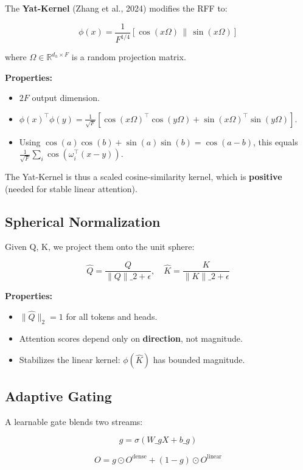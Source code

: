 The \textbf{Yat-Kernel} (Zhang et al., 2024) modifies the RFF to:

\[
\phi(x) = \frac{1}{F^{1/4}} [\cos(x \Omega) \,\|\, \sin(x \Omega)]
\]

where $\Omega \in \mathbb{R}^{d_h \times F}$ is a random projection matrix.

\textbf{Properties:}

\begin{itemize}
\item $2F$ output dimension.
\item $\phi(x)^\top \phi(y) = \frac{1}{\sqrt{F}} [\cos(x\Omega)^\top \cos(y\Omega) + \sin(x\Omega)^\top \sin(y\Omega)]$.
\item Using $\cos(a)\cos(b) + \sin(a)\sin(b) = \cos(a - b)$, this equals
  $\frac{1}{\sqrt{F}} \sum_i \cos(\omega_i^\top (x - y))$.

\end{itemize}
The Yat-Kernel is thus a scaled cosine-similarity kernel, which is 
\textbf{positive} (needed for stable linear attention).

\subsection{Spherical Normalization}

Given Q, K, we project them onto the unit sphere:

\[
\hat{Q} = \frac{Q}{\|Q\|\_2 + \epsilon}, \quad
\hat{K} = \frac{K}{\|K\|\_2 + \epsilon}
\]

\textbf{Properties:}

\begin{itemize}
\item $\|\hat{Q}\|_2 = 1$ for all tokens and heads.
\item Attention scores depend only on \textbf{direction}, not magnitude.
\item Stabilizes the linear kernel: $\phi(\hat{K})$ has bounded magnitude.

\end{itemize}
\subsection{Adaptive Gating}

A learnable gate blends two streams:

\[
g = \sigma(W\_g X + b\_g)
\]

\[
O = g \odot O^\text{dense} + (1 - g) \odot O^\text{linear}
\]

